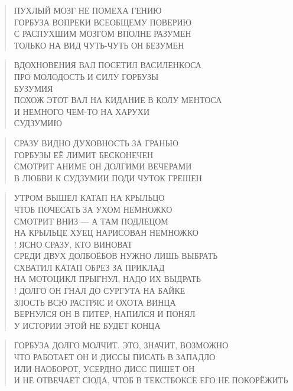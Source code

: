 \poemtitle{***}
\begin{verse}
ПУХЛЫЙ МОЗГ НЕ ПОМЕХА ГЕНИЮ\\
ГОРБУЗА ВОПРЕКИ ВСЕОБЩЕМУ ПОВЕРИЮ\\
С РАСПУХШИМ МОЗГОМ ВПОЛНЕ РАЗУМЕН\\
ТОЛЬКО НА ВИД ЧУТЬ-ЧУТЬ ОН БЕЗУМЕН
\end{verse}

\poemtitle{***}
\begin{verse}
ВДОХНОВЕНИЯ ВАЛ ПОСЕТИЛ ВАСИЛЕНКОСА\\
ПРО МОЛОДОСТЬ И СИЛУ ГОРБУЗЫ\\
БУЗУМИЯ\\
ПОХОЖ ЭТОТ ВАЛ НА КИДАНИЕ В КОЛУ МЕНТОСА\\
И НЕМНОГО ЧЕМ-ТО НА ХАРУХИ\\
СУДЗУМИЮ
\end{verse}

\poemtitle{***}
\begin{verse}
СРАЗУ ВИДНО ДУХОВНОСТЬ ЗА ГРАНЬЮ\\
ГОРБУЗЫ ЕЁ ЛИМИТ БЕСКОНЕЧЕН\\
СМОТРИТ АНИМЕ ОН ДОЛГИМИ ВЕЧЕРАМИ\\
В ЛЮБВИ К СУДЗУМИИ ПОДИ ЧУТОК ГРЕШЕН
\end{verse}

\poemtitle{***}
\begin{verse}
УТРОМ ВЫШЕЛ КАТАП НА КРЫЛЬЦО\\
ЧТОБ ПОЧЕСАТЬ ЗА УХОМ НЕМНОЖКО\\
СМОТРИТ ВНИЗ — А ТАМ ПОДЛЕЦОМ\\
НА КРЫЛЬЦЕ ХУЕЦ НАРИСОВАН НЕМНОЖКО\\!
ЯСНО СРАЗУ, КТО ВИНОВАТ\\
СРЕДИ ДВУХ ДОЛБОЁБОВ НУЖНО ЛИШЬ ВЫБРАТЬ\\
СХВАТИЛ КАТАП ОБРЕЗ ЗА ПРИКЛАД\\
НА МОТОЦИКЛ ПРЫГНУЛ, НАДО ИХ ВЫДРАТЬ\\!
ДОЛГО ОН ГНАЛ ДО СУРГУТА НА БАЙКЕ\\
ЗЛОСТЬ ВСЮ РАСТРЯС И ОХОТА ВИНЦА\\
ВЕРНУЛСЯ ОН В ПИТЕР, НАПИЛСЯ И ПОНЯЛ\\
У ИСТОРИИ ЭТОЙ НЕ БУДЕТ КОНЦА
\end{verse}

\poemtitle{***}
\begin{verse}
ГОРБУЗА ДОЛГО МОЛЧИТ. ЭТО, ЗНАЧИТ, ВОЗМОЖНО\\
ЧТО РАБОТАЕТ ОН И ДИССЫ ПИСАТЬ В ЗАПАДЛО\\
ИЛИ НАОБОРОТ, УСЕРДНО ДИСС ПИШЕТ ОН\\
И НЕ ОТВЕЧАЕТ СЮДА, ЧТОБ В ТЕКСТБОКСЕ ЕГО НЕ ПОКОРЁЖИТЬ
\end{verse}

